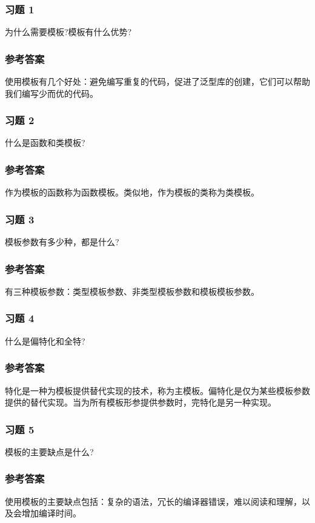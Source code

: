 
\subsubsection{习题 1}

为什么需要模板?模板有什么优势?

\subsubsection{参考答案}

使用模板有几个好处：避免编写重复的代码，促进了泛型库的创建，它们可以帮助我们编写少而优的代码。

\subsubsection{习题 2}

什么是函数和类模板?

\subsubsection{参考答案}

作为模板的函数称为函数模板。类似地，作为模板的类称为类模板。

\subsubsection{习题 3}

模板参数有多少种，都是什么?

\subsubsection{参考答案}

有三种模板参数：类型模板参数、非类型模板参数和模板模板参数。

\subsubsection{习题 4}

什么是偏特化和全特?

\subsubsection{参考答案}

特化是一种为模板提供替代实现的技术，称为主模板。偏特化是仅为某些模板参数提供的替代实现。当为所有模板形参提供参数时，完特化是另一种实现。

\subsubsection{习题 5}

模板的主要缺点是什么?

\subsubsection{参考答案}

使用模板的主要缺点包括：复杂的语法，冗长的编译器错误，难以阅读和理解，以及会增加编译时间。



